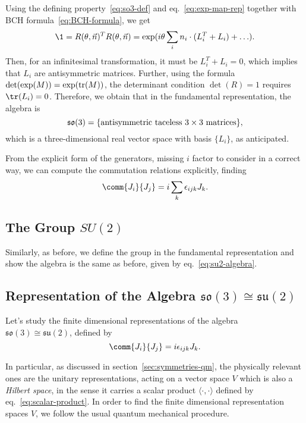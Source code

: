 Using the defining property~\eqref{eq:so3-def} and eq.~\eqref{eq:exp-map-rep} together with BCH formula~\eqref{eq:BCH-formula}, we get
\begin{equation*}
    \1 = R(\theta, \vec{n})^T R(\theta, \vec{n}) = \exp({i \theta \sum_i n_i \cdot ({L}_i^T + L_i) + \dots}) .
\end{equation*}
Then, for an infinitesimal transformation, it must be $L^T_i + L_i = 0$, which implies that $L_i$ are antisymmetric matrices. Further, using the formula $\det(\exp(M)) = \exp(\textup{tr}(M))$, the determinant condition $\det(R) = 1$ requires $\tr(L_i) = 0$. Therefore, we obtain that in the fundamental representation, the algebra is
\begin{equation}
    \mathfrak{so}(3) = \{ \textup{antisymmetric taceless $3 \times 3$ matrices}\},
\end{equation}
which is a three-dimensional real vector space with basis $\{L_i\}$, as anticipated.

From the explicit form of the generators, missing $i$ factor to consider in a correct way, we can compute the commutation relations explicitly, finding
\begin{equation}\label{eq:su2-algebra}
    \comm{J_i}{J_j} = i \sum_k \epsilon_{ijk} J_k .
\end{equation}

\subsection{The Group \texorpdfstring{$SU(2)$}{SU(2)}}
Similarly, as before, we define the group in the fundamental representation and show the algebra is the same as before, given by eq.~\eqref{eq:su2-algebra}. 

\subsection{Representation of the Algebra \texorpdfstring{$\mathfrak{so}(3) \cong \mathfrak{su}(2)$}{isomorphic}}
Let's study the finite dimensional representations of the algebra $\mathfrak{so}(3) \cong \mathfrak{su}(2)$, defined by
\begin{equation}\label{eq:su2-commutation-relations}
    \comm{J_i}{J_j} = i \epsilon_{ijk} J_k .
\end{equation}

In particular, as discussed in section~\ref{sec:symmetries-qm}, the physically relevant ones are the unitary representations, acting on a vector space $V$ which is also a \emph{Hilbert space}, in the sense it carries a scalar product $\langle \cdot, \cdot \rangle$ defined by eq.~\eqref{eq:scalar-product}. In order to find the finite dimensional representation spaces $V$, we follow the usual quantum mechanical procedure.

